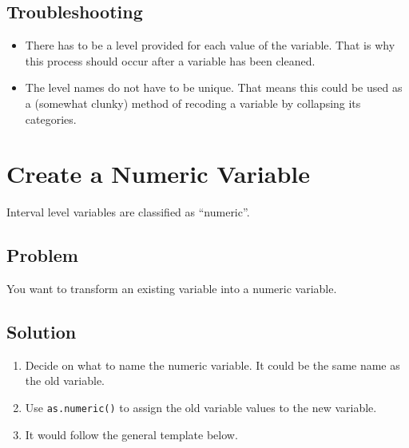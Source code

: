 \documentclass[
]{book}
\newenvironment{Shaded}{\begin{snugshade}}{\end{snugshade}}
\newcommand{\FunctionTok}[1]{\textcolor[rgb]{0.13,0.29,0.53}{\textbf{#1}}}
\newcommand{\NormalTok}[1]{#1}
\newcommand{\OtherTok}[1]{\textcolor[rgb]{0.56,0.35,0.01}{#1}}
\newcommand{\SpecialCharTok}[1]{\textcolor[rgb]{0.81,0.36,0.00}{\textbf{#1}}}
\providecommand{\tightlist}{%
  \setlength{\itemsep}{0pt}\setlength{\parskip}{0pt}}
\begin{document}
\hypertarget{troubleshooting-14}{%
\subsection{Troubleshooting}\label{troubleshooting-14}}

\begin{itemize}
\item
  There has to be a level provided for each value of the variable. That is why this process should occur after a variable has been cleaned.
\item
  The level names do not have to be unique. That means this could be used as a (somewhat clunky) method of recoding a variable by collapsing its categories.
\end{itemize}

\hypertarget{numeric}{%
\section{Create a Numeric Variable}\label{numeric}}

Interval level variables are classified as ``numeric''.

\hypertarget{problem-18}{%
\subsection{Problem}\label{problem-18}}

You want to transform an existing variable into a numeric variable.

\hypertarget{solution-17}{%
\subsection{Solution}\label{solution-17}}

\begin{enumerate}
\def\labelenumi{\arabic{enumi}.}
\tightlist
\item
  Decide on what to name the numeric variable. It could be the same name as the old variable.
\item
  Use \texttt{as.numeric()} to assign the old variable values to the new variable.
\item
  It would follow the general template below.
\end{enumerate}

\begin{Shaded}
\end{Shaded}
\end{document}
